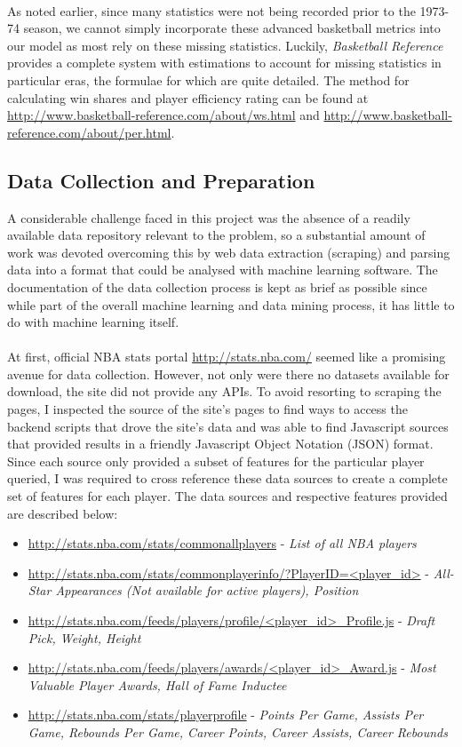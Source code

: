 \documentclass[paper=a4, fontsize=11pt]{scrartcl} %
\numberwithin{equation}{section} %
\numberwithin{figure}{section} %
\numberwithin{table}{section} %
\begin{document}
\\
As noted earlier, since many statistics were not being recorded prior to the 1973-74 season, we cannot simply incorporate these advanced basketball metrics into our model as most rely on these missing statistics. Luckily, \textit{Basketball Reference} provides a complete system with estimations to account for 	missing statistics in particular eras, the formulae for which are quite detailed. The method for calculating win shares and player efficiency rating can be found at \url{http://www.basketball-reference.com/about/ws.html} and \url{http://www.basketball-reference.com/about/per.html}.\\

\subsection{Data Collection and Preparation}

A considerable challenge faced in this project was the absence of a readily available data repository relevant to the problem, so a substantial amount of work was devoted overcoming this by web data extraction (scraping) and parsing data into a format that could be analysed with machine learning software. The documentation of the data collection process is kept as brief as possible since while part of the overall machine learning and data mining process, it has little to do with machine learning itself.\\
\\
At first, official NBA stats portal \url{http://stats.nba.com/} seemed like a promising avenue for data collection. However, not only were there no datasets available for download, the site did not provide any APIs. To avoid resorting to scraping the pages, I inspected the source of the site's pages to find ways to access the backend scripts that drove the site's data and was able to find Javascript sources that provided results in a friendly Javascript Object Notation (JSON) format. Since each source only provided a subset of features for the particular player queried, I was required to cross reference these data sources to create a complete set of features for each player. The data sources and respective features provided are described below:

\begin{itemize}
\item \url{http://stats.nba.com/stats/commonallplayers} - \textit{List of all NBA players}
\item \url{http://stats.nba.com/stats/commonplayerinfo/?PlayerID=<player_id>} - \textit{All-Star Appearances (Not available for active players), Position}
\item \url{http://stats.nba.com/feeds/players/profile/<player_id>_Profile.js} - \textit{Draft Pick, Weight, Height}
\item \url{http://stats.nba.com/feeds/players/awards/<player_id>_Award.js} - \textit{Most Valuable Player Awards, Hall of Fame Inductee}
\item \url{http://stats.nba.com/stats/playerprofile} - \textit{Points Per Game, Assists Per Game, Rebounds Per Game, Career Points, Career Assists, Career Rebounds}
\end{itemize}
\end{document}
